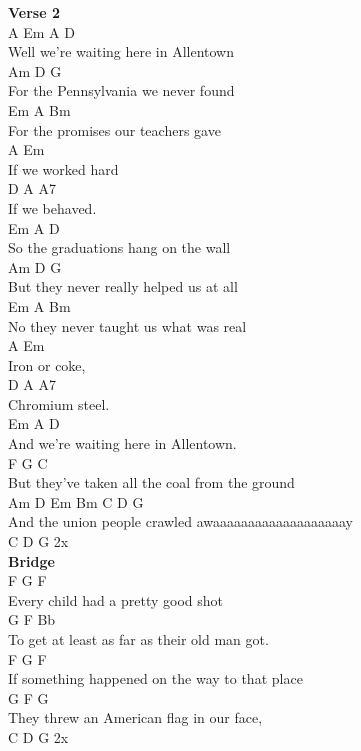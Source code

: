 \documentclass[a4paper]{article}
\begin{document}
{{        }
        \textbf{Verse 2}
        ~\\
        {
            \cutive
            \obeyspaces
A          Em              A    D
\\
Well we're waiting here in Allentown
\\
        Am           D        G
\\
For the Pennsylvania we never found
\\
        Em           A        Bm
\\
For the promises our teachers gave
\\
A            Em
\\
If we worked hard
\\
D       A    A7
\\
If we behaved.
\\
       Em          A           D
\\
So the graduations hang on the wall
\\
         Am           D            G
\\
But they never really helped us at all
\\
        Em              A        Bm
\\
No they never taught us what was real
\\
A       Em
\\
Iron or coke,
\\
D        A    A7
\\
Chromium steel.
\\
          Em              A    D
\\
And we're waiting here in Allentown.
\\
            F             G             C
\\
But they've taken all the coal from the ground
\\
        Am           D       Em          Bm       C D G
\\
And the union people crawled awaaaaaaaaaaaaaaaaaaay
\\
C D G 2x
\\

        }
        \textbf{Bridge}
        ~\\
        {
            \cutive
            \obeyspaces
F                 G           F
\\
Every child had a pretty good shot
\\
          G               F             Bb
\\
To get at least as far as their old man got.
\\
F                            G           F
\\
If something happened on the way to that place
\\
                            G          F G
\\
They threw an American flag in our face, 
\\
C D G 2x
\\

}}
\end{document}
